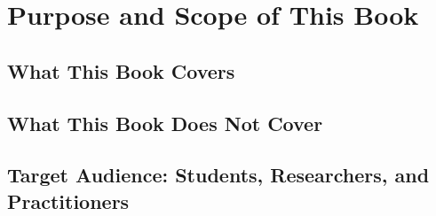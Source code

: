 \chapter{Purpose and Scope of This Book}
\section{What This Book Covers}
\section{What This Book Does Not Cover}
\section{Target Audience: Students, Researchers, and Practitioners}
